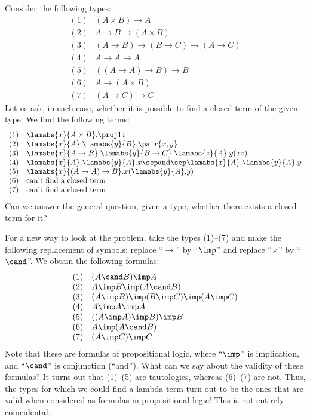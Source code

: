 \documentclass[12pt]{article}
\begin{document}
Consider the following types:
\[ \begin{array}{ll}
  (1)& (A\times B)\to A \\
  (2)& A\to B\to (A\times B) \\
  (3)& (A\to B)\to(B\to C)\to(A\to C) \\
  (4)& A\to A\to A \\
  (5)& ((A\to A)\to B)\to B \\
  (6)& A\to (A\times B) \\
  (7)& (A\to C)\to C
\end{array}
\]
Let us ask, in each case, whether it is possible to find a closed term
of the given type. We find the following terms:
\[ \begin{array}{ll}
  (1)& \lamabs{x}{A\times B}.\proj1 x \\
  (2)& \lamabs{x}{A}.\lamabs{y}{B}.\pair{x,y} \\
  (3)& \lamabs{x}{A\to B}.\lamabs{y}{B\to C}.\lamabs{z}{A}.y(xz) \\
  (4)& \lamabs{x}{A}.\lamabs{y}{A}.x 
  \sep\mbox{and}\sep
  \lamabs{x}{A}.\lamabs{y}{A}.y \\
  (5)& \lamabs{x}{(A\to A)\to B}.x(\lamabs{y}{A}.y) \\
  (6)& \mbox{can't find a closed term} \\
  (7)& \mbox{can't find a closed term}
\end{array}
\]
Can we answer the general question, given a type, whether there exists
a closed term for it?

For a new way to look at the problem, take the types (1)--(7) and
make the following replacement of symbols: replace ``$\to$'' by
``$\imp$'' and replace ``$\times$'' by ``$\cand$''. We obtain the
following formulas:
\[ \begin{array}{ll}
  (1)& (A\cand B)\imp A \\
  (2)& A\imp B\imp (A\cand B) \\
  (3)& (A\imp B)\imp(B\imp C)\imp(A\imp C) \\
  (4)& A\imp A\imp A \\
  (5)& ((A\imp A)\imp B)\imp B \\
  (6)& A\imp (A\cand B) \\
  (7)& (A\imp C)\imp C
\end{array}
\]
Note that these are formulas of propositional logic, where ``$\imp$''
is implication, and ``$\cand$'' is conjunction (``and''). What can we
say about the validity of these formulas? It turns out that (1)--(5)
are tautologies, whereas (6)--(7) are not. Thus, the types for which we
could find a lambda term turn out to be the ones that are valid
when considered as formulas in propositional logic! This is not
entirely coincidental.
\end{document}
